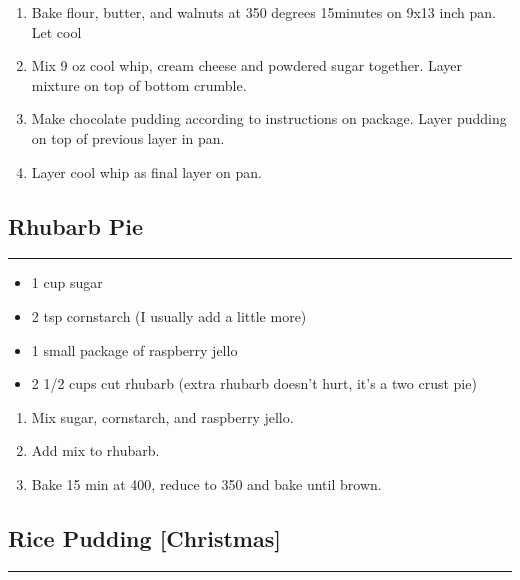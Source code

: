 \documentclass{article}
\begin{document}
\begin{enumerate}
    \item 
        Bake flour, butter, and walnuts at 350 degrees 15minutes on 9x13 inch pan. Let cool
    \item 
        Mix 9 oz cool whip, cream cheese and powdered sugar together. Layer mixture on top of bottom crumble.
    \item 
        Make chocolate pudding according to instructions on package. Layer pudding on top of previous layer in pan.
    \item 
        Layer cool whip as final layer on pan. 
\end{enumerate}
\newpage

\subsection{Rhubarb Pie} 
\noindent\rule[0.5ex]{\linewidth}{1pt}

\begin{framed}
\begin{itemize}
    \item 1 cup sugar
    \item 2 tsp cornstarch (I usually add a little more)
    \item 1 small package of raspberry jello
    \item 2 1/2 cups cut rhubarb (extra rhubarb doesn't hurt, it's a two crust pie)
\end{itemize}
\end{framed}

\begin{enumerate}
    \item 
        Mix sugar, cornstarch, and raspberry jello.
    \item 
        Add mix to rhubarb. 
    \item
        Bake 15 min at 400, reduce to 350 and bake until brown.
\end{enumerate}
\newpage

\subsection{Rice Pudding [Christmas]} 
\noindent\rule[0.5ex]{\linewidth}{1pt}
\end{document}
